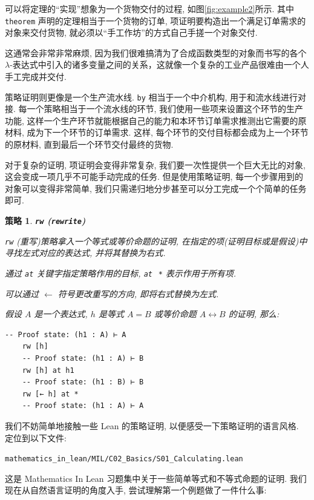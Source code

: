 \documentclass[UTF8]{ctexart}
\DeclareMathOperator{\0}{\mathbf{0}}                    %
\newcommand{\<}{\langle}
\renewcommand{\>}{\rangle}                              %
\newenvironment{thm_box}{
    \begin{tcolorbox}[enhanced, colback=thm_blue2, boxrule=0pt, frame hidden,
        borderline west={0.7mm}{0.1mm}{thm_blue1},breakable]
    }
    {\end{tcolorbox}}
\theoremstyle{MyStyle} %
\newtheorem{mytactic}{策略}
\newenvironment{tactic}[1]
{
    \begin{thm_box}
        \begin{mytactic}
            \textbf{#1}
            \newline
}
{
        \end{mytactic}
    \end{thm_box}
}
\newcommand*{\lean}[1]{\texttt{\color{blue}#1}}
\begin{document}
        可以将定理的``实现''想象为一个货物交付的过程, 如图\ref{fig:example2}所示. 其中 \lean{theorem} 声明的定理相当于一个货物的订单, 项证明要构造出一个满足订单需求的对象来交付货物, 就必须以``手工作坊''的方式自己手搓一个对象交付. 
        
        这通常会非常非常麻烦, 因为我们很难搞清为了合成函数类型的对象而书写的各个 $\lambda$-表达式中引入的诸多变量之间的关系，这就像一个复杂的工业产品很难由一个人手工完成并交付. 

        策略证明则更像是一个生产流水线. \lean{by} 相当于一个中介机构, 用于和流水线进行对接. 每一个策略相当于一个流水线的环节, 我们使用一些项来设置这个环节的生产功能, 这样一个生产环节就能根据自己的能力和本环节订单需求推测出它需要的原材料, 成为下一个环节的订单需求. 这样, 每个环节的交付目标都会成为上一个环节的原材料, 直到最后一个环节交付最终的货物. 

        对于复杂的证明, 项证明会变得非常复杂, 我们要一次性提供一个巨大无比的对象, 这会变成一项几乎不可能手动完成的任务. 但是使用策略证明, 每一个步骤用到的对象可以变得非常简单, 我们只需递归地分步甚至可以分工完成一个个简单的任务即可. 

        \begin{tactic}
            {\lean{rw} (\lean{rewrite})}
            \lean{rw} (重写)策略拿入一个等式或等价命题的证明, 在指定的项(证明目标或是假设)中寻找左式对应的表达式, 并将其替换为右式. 

            通过 \lean{at} 关键字指定策略作用的目标, \lean{at}\, \,\texttt{*} 表示作用于所有项. 
            
            可以通过 $\leftarrow$ 符号更改重写的方向, 即将右式替换为左式. 
            
            假设 $A$ 是一个表达式, $h$ 是等式 $A=B$ 或等价命题 $A\leftrightarrow B$ 的证明, 那么: 
            \begin{lstlisting}[style=lean]
    -- Proof state: (h1 : A) ⊢ A
    rw [h]
    -- Proof state: (h1 : A) ⊢ B
    rw [h] at h1
    -- Proof state: (h1 : B) ⊢ B
    rw [← h] at *
    -- Proof state: (h1 : A) ⊢ A
            \end{lstlisting}

        \end{tactic}
        
        我们不妨简单地接触一些 Lean 的策略证明, 以便感受一下策略证明的语言风格. 定位到以下文件: 

        \texttt{mathematics\_in\_lean/MIL/C02\_Basics/S01\_Calculating.lean}

        这是 Mathematics In Lean 习题集中关于一些简单等式和不等式命题的证明. 我们现在从自然语言证明的角度入手, 尝试理解第一个例题做了一件什么事: 
\end{document}
